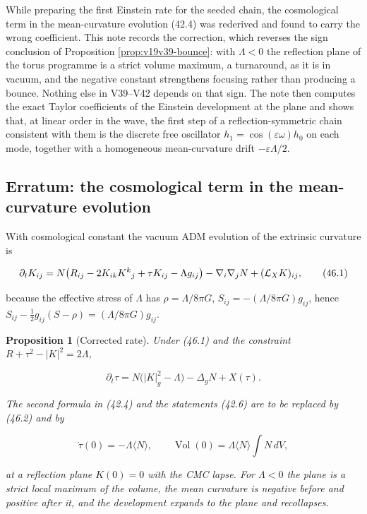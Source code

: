 \documentclass[11pt]{article}
\newtheorem{proposition}[theorem]{Proposition}
\theoremstyle{remark}
\begin{document}
While preparing the first Einstein rate for the seeded chain, the
cosmological term in the mean-curvature evolution (42.4) was rederived
and found to carry the wrong coefficient.  This note records the
correction, which reverses the sign conclusion of Proposition
\ref{prop:v19v39-bounce}: with \(\Lambda<0\) the reflection plane of
the torus programme is a strict volume maximum, a turnaround, as it is
in vacuum, and the negative constant strengthens focusing rather than
producing a bounce.  Nothing else in V39--V42 depends on that sign.
The note then computes the exact Taylor coefficients of the Einstein
development at the plane and shows that, at linear order in the wave,
the first step of a reflection-symmetric chain consistent with them is
the discrete free oscillator \(h_1=\cos(\varepsilon\omega)h_0\) on each
mode, together with a homogeneous mean-curvature drift
\(-\varepsilon\Lambda/2\).

\subsection{Erratum: the cosmological term in the mean-curvature evolution}

With cosmological constant the vacuum ADM evolution of the extrinsic
curvature is

\[
 \partial_tK_{ij}=N\bigl(R_{ij}-2K_{ik}K^k{}_j+\tau K_{ij}-\Lambda g_{ij}\bigr)
 -\nabla_i\nabla_jN+({\cal L}_XK)_{ij},                              \tag{46.1}
\]

because the effective stress of \(\Lambda\) has \(\rho=\Lambda/8\pi G\),
\(S_{ij}=-(\Lambda/8\pi G)g_{ij}\), hence
\(S_{ij}-\tfrac12g_{ij}(S-\rho)=(\Lambda/8\pi G)g_{ij}\).

\begin{proposition}[Corrected rate]
\label{prop:v19v43-rate}
Under (46.1) and the constraint \(R+\tau^2-|K|^2=2\Lambda\),

\[
 \partial_t\tau=N\bigl(|K|_g^2-\Lambda\bigr)-\Delta_gN+X(\tau).        \tag{46.2}
\]

The second formula in (42.4) and the statements (42.6) are to be
replaced by (46.2) and by

\[
 \dot\tau(0)=-\Lambda\langle N\rangle,\qquad
 \ddot{\operatorname{Vol}}(0)=\Lambda\langle N\rangle\int N\,dV,        \tag{46.3}
\]

at a reflection plane \(K(0)=0\) with the CMC lapse.  For
\(\Lambda<0\) the plane is a strict local maximum of the volume, the
mean curvature is negative before and positive after it, and the
development expands to the plane and recollapses.
\end{proposition}
\end{document}

